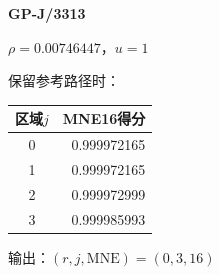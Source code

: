 \begin{minipage}[c]{0.38\textwidth}\centering\small
\textbf{GP-J/3313}\par\medskip
\par\medskip
\end{minipage}\hfill
\begin{minipage}[c]{0.59\textwidth}\centering\small
$\rho=0.00746447$，$u=1$\par
保留参考路径时：\par\smallskip
\begin{tabular}{cr}\toprule 区域$j$ & MNE16得分\\\midrule
0 & 0.999972165\\
1 & 0.999972165\\
2 & 0.999972999\\
3 & 0.999985993\\
\bottomrule\end{tabular}\par\smallskip
输出：$(r,j,\mathrm{MNE})=(0,3,16)$
\end{minipage}
